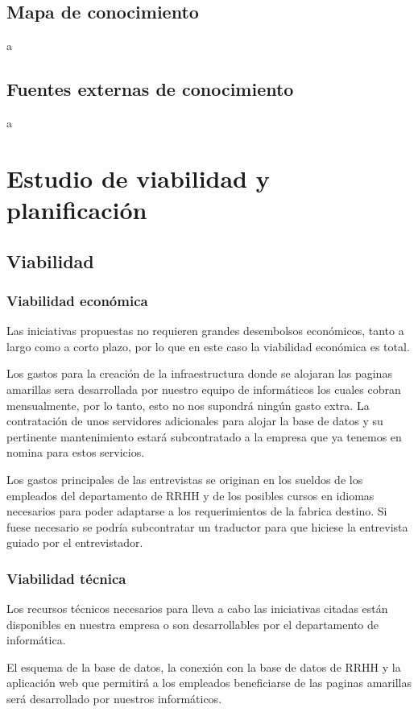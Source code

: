 \documentclass[a4paper]{article}
\begin{document}
\subsection{Mapa de conocimiento}

a

\subsection{Fuentes externas de conocimiento}

a


\section{Estudio de viabilidad y planificación}

\subsection{Viabilidad}

\subsubsection{Viabilidad económica}
Las iniciativas propuestas no requieren grandes desembolsos económicos, tanto a largo como a corto plazo, por lo que en este caso la viabilidad económica es total.\par
Los gastos para la creación de la infraestructura donde se alojaran las paginas amarillas sera desarrollada por nuestro equipo de informáticos los cuales cobran mensualmente, por lo tanto, esto no nos supondrá ningún gasto extra. La contratación de unos servidores adicionales para alojar la base de datos y su pertinente mantenimiento estará subcontratado a la empresa que ya tenemos en nomina para estos servicios.\par
Los gastos principales de las entrevistas se originan en los sueldos de los empleados del departamento de RRHH y de los posibles cursos en idiomas necesarios para poder adaptarse a los requerimientos de la fabrica destino. Si fuese necesario se podría subcontratar un traductor para que hiciese la entrevista guiado por el entrevistador.

\subsubsection{Viabilidad técnica}
Los recursos técnicos necesarios para lleva a cabo las iniciativas citadas están disponibles en nuestra empresa o son desarrollables por el departamento de informática.\par
El esquema de la base de datos, la conexión con la base de datos de RRHH y la aplicación web que permitirá a los empleados beneficiarse de las paginas amarillas será desarrollado por nuestros informáticos. 
\end{document}
